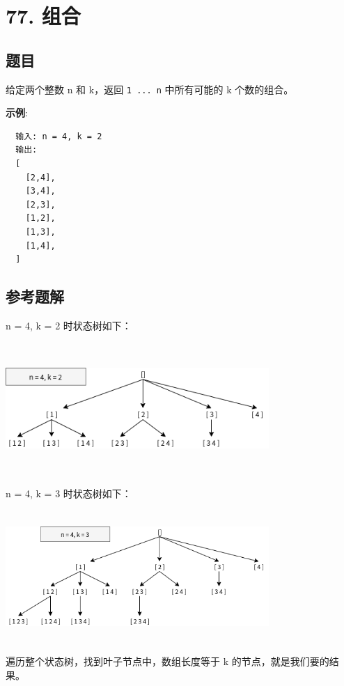 \newpage
\section{77. 组合}
\label{leetcode:77}

\subsection{题目}

给定两个整数 n 和 k，返回 \verb|1 ... n| 中所有可能的 k 个数的组合。

\textbf{示例}:

\begin{verbatim}
  输入: n = 4, k = 2
  输出:
  [
    [2,4],
    [3,4],
    [2,3],
    [1,2],
    [1,3],
    [1,4],
  ]
\end{verbatim}

\subsection{参考题解}

n = 4, k = 2 时状态树如下：

\includegraphics[width=100mm,height=50mm]{images/leetcode/leetcode_77.png}

n = 4, k = 3 时状态树如下：

\includegraphics[width=100mm,height=50mm]{images/leetcode/leetcode_77_4_3.png}

遍历整个状态树，找到叶子节点中，数组长度等于 k 的节点，就是我们要的结果。

